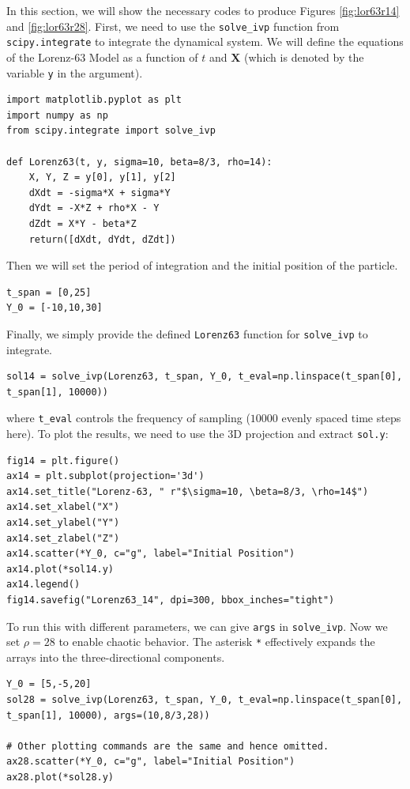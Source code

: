 In this section, we will show the necessary codes to produce Figures \ref{fig:lor63r14} and \ref{fig:lor63r28}. First, we need to use the \verb|solve_ivp| function from \verb|scipy.integrate| to integrate the dynamical system. We will define the equations of the Lorenz-63 Model as a function of $t$ and $\textbf{X}$ (which is denoted by the variable \verb|y| in the argument).
\begin{lstlisting}
import matplotlib.pyplot as plt
import numpy as np
from scipy.integrate import solve_ivp

def Lorenz63(t, y, sigma=10, beta=8/3, rho=14):
    X, Y, Z = y[0], y[1], y[2]
    dXdt = -sigma*X + sigma*Y
    dYdt = -X*Z + rho*X - Y
    dZdt = X*Y - beta*Z
    return([dXdt, dYdt, dZdt])
\end{lstlisting}
Then we will set the period of integration and the initial position of the particle.
\begin{lstlisting}
t_span = [0,25]
Y_0 = [-10,10,30]
\end{lstlisting}
Finally, we simply provide the defined \verb|Lorenz63| function for \verb|solve_ivp| to integrate.
\begin{lstlisting}
sol14 = solve_ivp(Lorenz63, t_span, Y_0, t_eval=np.linspace(t_span[0], t_span[1], 10000))
\end{lstlisting}
where \verb|t_eval| controls the frequency of sampling ($10000$ evenly spaced time steps here). To plot the results, we need to use the 3D projection and extract \verb|sol.y|:
\begin{lstlisting}
fig14 = plt.figure()
ax14 = plt.subplot(projection='3d')
ax14.set_title("Lorenz-63, " r"$\sigma=10, \beta=8/3, \rho=14$")
ax14.set_xlabel("X")
ax14.set_ylabel("Y")
ax14.set_zlabel("Z")
ax14.scatter(*Y_0, c="g", label="Initial Position")
ax14.plot(*sol14.y)
ax14.legend()
fig14.savefig("Lorenz63_14", dpi=300, bbox_inches="tight")
\end{lstlisting}
To run this with different parameters, we can give \verb|args| in \verb|solve_ivp|. Now we set $\rho = 28$ to enable chaotic behavior. The asterisk \verb|*| effectively expands the arrays into the three-directional components.
\begin{lstlisting}
Y_0 = [5,-5,20]
sol28 = solve_ivp(Lorenz63, t_span, Y_0, t_eval=np.linspace(t_span[0], t_span[1], 10000), args=(10,8/3,28))

# Other plotting commands are the same and hence omitted.
ax28.scatter(*Y_0, c="g", label="Initial Position")
ax28.plot(*sol28.y)
\end{lstlisting}
